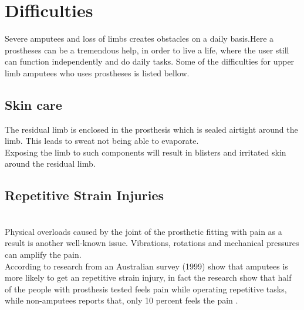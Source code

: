 
\section{Difficulties} \label{Difficoulties}
Severe amputees and loss of limbs creates obstacles on a daily basis.Here a prostheses can be a tremendous help, in order to live a life, where the user still can function independently and do daily tasks.  Some of the difficulties for upper limb amputees who uses prostheses is listed bellow.\\

\subsection*{Skin care}
The residual limb is enclosed in the prosthesis which is sealed airtight around the limb. This leads to sweat not being able to evaporate.\\
Exposing the limb to such components will result in blisters and irritated skin around the residual limb\cite{SkinCare}.\\

\subsection*{Repetitive Strain Injuries}\\
Physical overloads caused by the joint of the prosthetic fitting with pain as a result is another well-known issue. Vibrations, rotations and mechanical pressures can amplify the pain.\\
According to research from an Australian survey (1999)  show that amputees is more likely to get an repetitive strain injury, in fact  the research show that half of the people with prosthesis tested feels pain while operating repetitive tasks, while non-amputees reports that, only 10 percent feels the pain \cite{StrainInjuries}.\\

